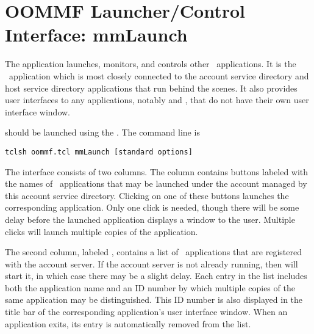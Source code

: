 \chapter{OOMMF Launcher/Control Interface: mmLaunch}\label{sec:mmlaunch}

\begin{center}
\end{center}

The application  launches, monitors, and controls other 
\OOMMF\ applications.  It is the \OOMMF\ application which is
most closely connected to the account service directory and host
service directory applications that run behind the scenes.  It also
provides user interfaces
to any applications, notably
 and
, that do not have their own user interface
window.

 should be launched using the .  The command
line is
\begin{verbatim}
tclsh oommf.tcl mmLaunch [standard options]
\end{verbatim}

The  interface consists of two columns. The
 column contains buttons labeled with the names of
\OOMMF\ applications that may be launched under the account managed by
this account service directory.  Clicking on one of these buttons
launches the corresponding application.  Only one click is needed,
though there will be some delay before the launched application
displays a window to the user.  Multiple clicks will launch multiple
copies of the application.

The second column, labeled , contains a list
of \OOMMF\ applications that are registered with the account
server. If the account server is not already running, then
 will start it, in which case there may be a slight
delay. Each entry in the  list includes both
the application name and an ID number by which multiple copies of the
same application may be distinguished.  This ID number is also
displayed in the title bar of the corresponding application's user
interface window.  When an application exits, its entry is
automatically removed from the  list.

